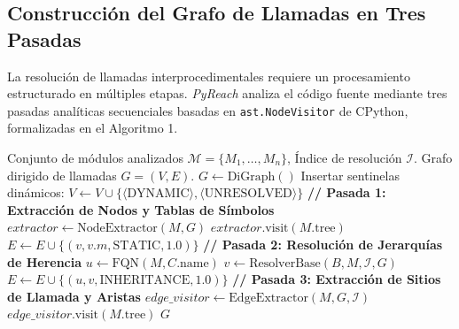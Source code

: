 \documentclass[conference]{IEEEtran}
\begin{document}
\subsection{Construcción del Grafo de Llamadas en Tres Pasadas}
La resolución de llamadas interprocedimentales requiere un procesamiento estructurado en múltiples etapas. \textit{PyReach} analiza el código fuente mediante tres pasadas analíticas secuenciales basadas en \texttt{ast.NodeVisitor} de CPython, formalizadas en el Algoritmo 1.

\begin{algorithm}[t]
\caption{Construcción del Grafo de Llamadas en Tres Pasadas}
\label{alg:callgraph_construction}
\begin{algorithmic}[1]
\REQUIRE Conjunto de módulos analizados $\mathcal{M} = \{M_1, \dots, M_n\}$, Índice de resolución $\mathcal{I}$.
\ENSURE Grafo dirigido de llamadas $G = (V, E)$.
\STATE $G \leftarrow \text{DiGraph}()$
\STATE Insertar sentinelas dinámicos: $V \leftarrow V \cup \{\langle\text{DYNAMIC}\rangle, \langle\text{UNRESOLVED}\rangle\}$
\STATE \textbf{// Pasada 1: Extracción de Nodos y Tablas de Símbolos}
    \STATE $\mathit{extractor} \leftarrow \text{NodeExtractor}(M, G)$
    \STATE $\mathit{extractor}.\text{visit}(M.\text{tree})$
\ENDFOR
{}
            \STATE $E \leftarrow E \cup \{(v, v.m, \text{STATIC}, 1.0)\}$
        \ENDIF
    \ENDFOR
\ENDFOR
\STATE \textbf{// Pasada 2: Resolución de Jerarquías de Herencia}
        \STATE $u \leftarrow \text{FQN}(M, C.\text{name})$
            \STATE $v \leftarrow \text{ResolverBase}(B, M, \mathcal{I}, G)$
                \STATE $E \leftarrow E \cup \{(u, v, \text{INHERITANCE}, 1.0)\}$
            \ENDIF
        \ENDFOR
    \ENDFOR
\ENDFOR
\STATE \textbf{// Pasada 3: Extracción de Sitios de Llamada y Aristas}
    \STATE $\mathit{edge\_visitor} \leftarrow \text{EdgeExtractor}(M, G, \mathcal{I})$
    \STATE $\mathit{edge\_visitor}.\text{visit}(M.\text{tree})$
\ENDFOR
\RETURN $G$
\end{algorithmic}
\end{algorithm}
\end{document}
